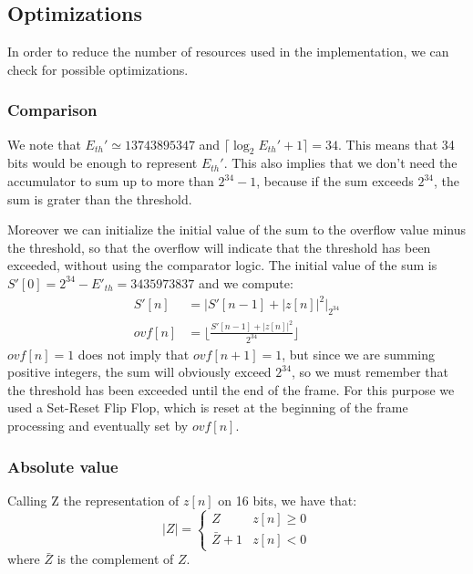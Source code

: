 \subsection{Optimizations}
\label{sec:optimizations}

In order to reduce the number of resources used in the implementation, we can
check for possible optimizations.

\subsubsection{Comparison}
We note that $E_{th}' \simeq 13743895347$ and $\lceil\log_2 E_{th}' + 1\rceil = 34$.
This means that 34 bits would be enough to represent $E_{th}'$. This also implies
that we don't need the accumulator to sum up to more than $2^{34} - 1$, because
if the sum exceeds $2^{34}$, the sum is grater than the threshold.

Moreover we can initialize the initial value of the sum to the overflow value
minus the threshold, so that the overflow will indicate that the threshold has
been exceeded, without using the comparator logic. The initial value of the sum
is $S'[0] = 2^{34} - E'_{th} = 3435973837$ and we compute:
\begin{align*}
  S'[n] &= \bigg| S'[n-1] + |z[n]|^2 \bigg|_{2^{34}}\\
  ovf[n] &= \bigg\lfloor \frac{S'[n-1] + |z[n]|^2}{2^{34}} \bigg\rfloor
\end{align*}
$ovf[n] = 1$ does not imply that $ovf[n + 1] = 1$, but since we are summing
positive integers, the sum will obviously exceed $2^{34}$, so we must remember
that the threshold has been exceeded until the end of the frame.
For this purpose we used a Set-Reset Flip Flop, which is reset at the beginning
of the frame processing and eventually set by $ovf[n]$.

\subsubsection{Absolute value}
\label{sec:opt-abs}

Calling Z the representation of $z[n]$ on 16 bits, we have that:
\begin{equation}
  |Z| = \begin{cases}
    Z & z[n] \ge 0 \\
    \bar{Z}+1 & z[n] < 0
  \end{cases}
\end{equation}
where $\bar{Z}$ is the complement of $Z$.

